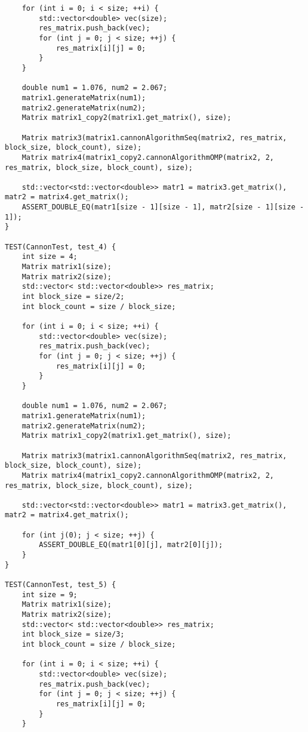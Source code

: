 \documentclass{report}
\begin{document}
\begin{lstlisting}
    for (int i = 0; i < size; ++i) {
        std::vector<double> vec(size);
        res_matrix.push_back(vec);
        for (int j = 0; j < size; ++j) {
            res_matrix[i][j] = 0;
        }
    }

    double num1 = 1.076, num2 = 2.067;
    matrix1.generateMatrix(num1);
    matrix2.generateMatrix(num2);
    Matrix matrix1_copy2(matrix1.get_matrix(), size);

    Matrix matrix3(matrix1.cannonAlgorithmSeq(matrix2, res_matrix, block_size, block_count), size);
    Matrix matrix4(matrix1_copy2.cannonAlgorithmOMP(matrix2, 2, res_matrix, block_size, block_count), size);

    std::vector<std::vector<double>> matr1 = matrix3.get_matrix(), matr2 = matrix4.get_matrix();
    ASSERT_DOUBLE_EQ(matr1[size - 1][size - 1], matr2[size - 1][size - 1]);
}

TEST(CannonTest, test_4) {
    int size = 4;
    Matrix matrix1(size);
    Matrix matrix2(size);
    std::vector< std::vector<double>> res_matrix;
    int block_size = size/2;
    int block_count = size / block_size;

    for (int i = 0; i < size; ++i) {
        std::vector<double> vec(size);
        res_matrix.push_back(vec);
        for (int j = 0; j < size; ++j) {
            res_matrix[i][j] = 0;
        }
    }

    double num1 = 1.076, num2 = 2.067;
    matrix1.generateMatrix(num1);
    matrix2.generateMatrix(num2);
    Matrix matrix1_copy2(matrix1.get_matrix(), size);

    Matrix matrix3(matrix1.cannonAlgorithmSeq(matrix2, res_matrix, block_size, block_count), size);
    Matrix matrix4(matrix1_copy2.cannonAlgorithmOMP(matrix2, 2, res_matrix, block_size, block_count), size);

    std::vector<std::vector<double>> matr1 = matrix3.get_matrix(), matr2 = matrix4.get_matrix();

    for (int j(0); j < size; ++j) {
        ASSERT_DOUBLE_EQ(matr1[0][j], matr2[0][j]);
    }
}

TEST(CannonTest, test_5) {
    int size = 9;
    Matrix matrix1(size);
    Matrix matrix2(size);
    std::vector< std::vector<double>> res_matrix;
    int block_size = size/3;
    int block_count = size / block_size;

    for (int i = 0; i < size; ++i) {
        std::vector<double> vec(size);
        res_matrix.push_back(vec);
        for (int j = 0; j < size; ++j) {
            res_matrix[i][j] = 0;
        }
    }


\end{lstlisting}
\end{document}
